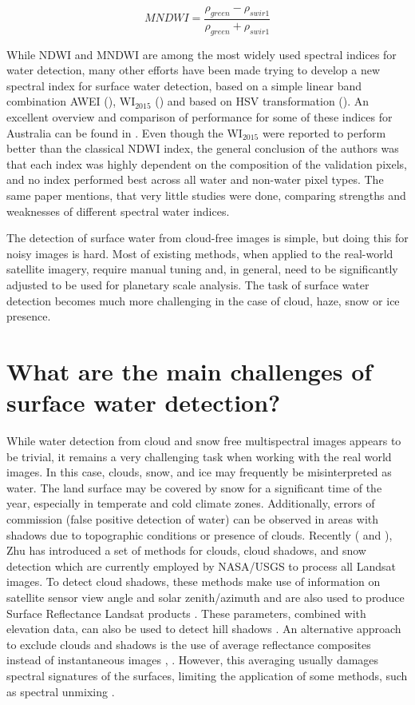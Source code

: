 \begin{equation}
MNDWI =  \frac{\rho_{green} - \rho_{swir1}}{\rho_{green} + \rho_{swir1}} 
\end{equation}

While NDWI and MNDWI are among the most widely used spectral indices for water detection, many other efforts have been made trying to develop a new spectral index for surface water detection, based on a simple linear band combination AWEI (\citep{feyisa2014automated}), WI$_{2015}$ (\citep{fisher2016comparing}) and based on HSV transformation (\citep{pekel2014near}). An excellent overview and comparison of performance for some of these indices for Australia can be found in \citep{fisher2016comparing}. Even though the WI$_{2015}$ were reported to perform better than the classical NDWI index, the general conclusion of the authors was that each index was highly dependent on the composition of the validation pixels, and no index performed best across all water and non-water pixel types. The same paper mentions, that very little studies were done, comparing strengths and weaknesses of different spectral water indices. 

The detection of surface water from cloud-free images is simple, but doing this for noisy images is hard. Most of existing methods, when applied to the real-world satellite imagery, require manual tuning and, in general, need to be significantly adjusted to be used for planetary scale analysis. The task of surface water detection becomes much more challenging in the case of cloud, haze, snow or ice presence. 

\section{What are the main challenges of surface water detection?}

While water detection from cloud and snow free multispectral images appears to be trivial, it remains a very challenging task when working with the real world images. In this case, clouds, snow, and ice may frequently be misinterpreted as water. The land surface may be covered by snow for a significant time of the year, especially in temperate and cold climate zones. Additionally, errors of commission (false positive detection of water) can be observed in areas with shadows due to topographic conditions or presence of clouds. Recently (\citep{Zhu2014} and \citep{Zhu2012}), Zhu has introduced a set of methods for clouds, cloud shadows, and snow detection which are currently employed by NASA/USGS to process all Landsat images. To detect cloud shadows, these methods make use of information on satellite sensor view angle and solar zenith/azimuth and are also used to produce Surface Reflectance Landsat products \citep{webLandsat}. These parameters, combined with elevation data, can also be used to detect hill shadows \citep{Tan2013}. An alternative approach to exclude clouds and shadows is the use of average reflectance composites instead of instantaneous images \citep{Potapov2012}, \citep{Hansen2013}. However, this averaging usually damages spectral signatures of the surfaces, limiting the application of some methods, such as spectral unmixing \citep{keshava2003survey}.

